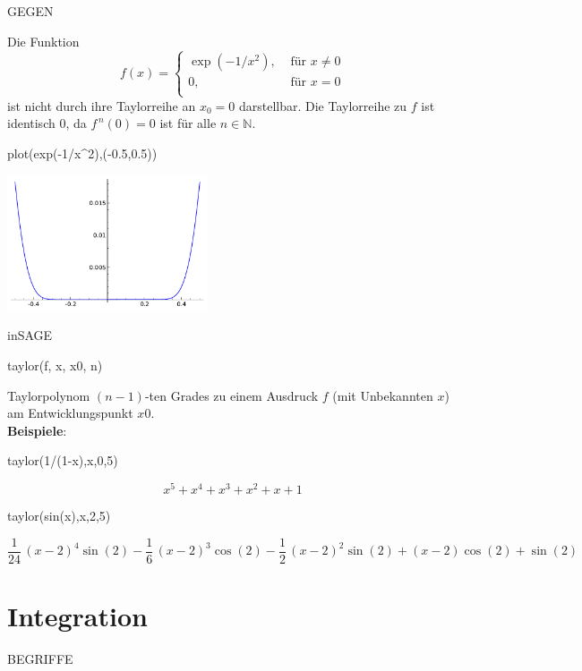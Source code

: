 \documentclass[fontsize=12pt,paper=a4,twoside,bibtotoc,idxtotoc,
liststotoc,pagesize,BCOR1.2cm,DIV15,chapterprefix,pagesize=pdftex]{scrbook}
\theoremstyle{plain}
\theoremstyle{definition}
\theoremstyle{remark}
\begin{document}
GEGEN

Die Funktion
\[ f(x) = \left \{ \begin{array}{ll}
\exp(-1/x^2), & \mbox{ für } x \neq 0\\
0, & \mbox{ für } x = 0\\
\end{array} \right. \]
ist nicht durch ihre Taylorreihe an $x_0=0$ darstellbar. Die Taylorreihe zu $f$
ist identisch $0$, da $f^{\,n}(0)=0$ ist für alle $n \in \mathbb{N}$. \\
\begin{sagein}
plot(exp(-1/x^2),(-0.5,0.5)) 
\end{sagein}
\begin{center}
  \includegraphics[height=4cm]{taylorgegen.pdf}
 \end{center}

inSAGE

\begin{sagein}
taylor(f, x, x0, n)
\end{sagein}
Taylorpolynom $(n-1)$-ten Grades zu einem Ausdruck $f$ 
(mit Unbekannten $x$) am Entwicklungspunkt $x0$. \\
\textbf{Beispiele}:
\begin{sagein}
taylor(1/(1-x),x,0,5)
\end{sagein}
{\color{blue}\[ x^{5} + x^{4} + x^{3} + x^{2} + x + 1\]}
\begin{sagein}
taylor(sin(x),x,2,5)
\end{sagein}
{\small\color{blue}\[ \frac{1}{24} \, {\left(x - 2\right)}^{4} \sin\left(2\right) -
\frac{1}{6} \, {\left(x - 2\right)}^{3} \cos\left(2\right) - \frac{1}{2}
\, {\left(x - 2\right)}^{2} \sin\left(2\right) + {\left(x - 2\right)}
\cos\left(2\right) + \sin\left(2\right)\]}

\section{Integration}

BEGRIFFE
\end{document}
